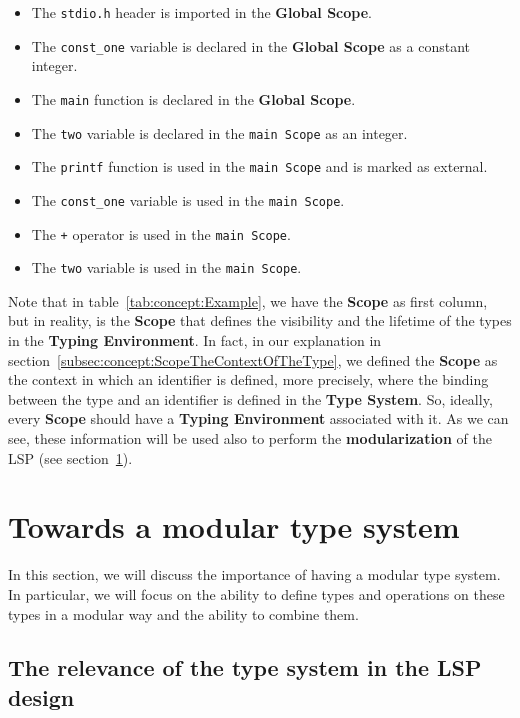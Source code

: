 \begin{itemize}
    \item The \texttt{stdio.h} header is imported in the \textbf{Global Scope}.
    \item The \texttt{const\_one} variable is declared in the \textbf{Global Scope} as a constant integer.
    \item The \texttt{main} function is declared in the \textbf{Global Scope}.
    \item The \texttt{two} variable is declared in the \texttt{main Scope} as an integer.
    \item The \texttt{printf} function is used in the \texttt{main Scope} and is marked as external.
    \item The \texttt{const\_one} variable is used in the \texttt{main Scope}.
    \item The \texttt{+} operator is used in the \texttt{main Scope}.
    \item The \texttt{two} variable is used in the \texttt{main Scope}.
\end{itemize}

Note that in table~\ref{tab:concept:Example}, we have the \textbf{Scope} as first column, but in reality, is the \textbf{Scope} that defines the visibility and the lifetime of the types in the \textbf{Typing Environment}. In fact, in our explanation in section~\ref{subsec:concept:ScopeTheContextOfTheType}, we defined the \textbf{Scope} as the context in which an identifier is defined, more precisely, where the binding between the type and an identifier is defined in the \textbf{Type System}. So, ideally, every \textbf{Scope} should have a \textbf{Typing Environment} associated with it.
As we can see, these information will be used also to perform the \textbf{modularization} of the LSP (see section~\ref{sec:concept:TowardsAModularTypeSystem}).


\section{Towards a modular type system}\label{sec:concept:TowardsAModularTypeSystem}

In this section, we will discuss the importance of having a modular type system. In particular, we will focus on the ability to define types and operations on these types in a modular way and the ability to combine them.


\subsection{The relevance of the type system in the LSP design}\label{subsec:concept:RelevanceOfTheTypeSystem}

